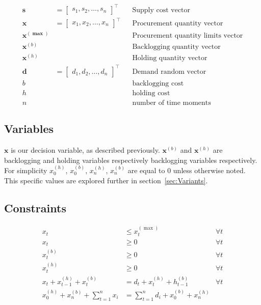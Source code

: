 \begin{align*}
    \mathbf{s} &= \begin{bmatrix}
        s_1, s_2, \dotsc, s_n
    \end{bmatrix}^\intercal && \text{Supply cost vector} \\
    \mathbf{x} &= \begin{bmatrix}
        x_1, x_2, \dotsc, x_n
    \end{bmatrix}^\intercal && \text{Procurement quantity vector} \\
    \mathbf{x^{(\max)}}  & && \text{Procurement quantity limits vector} \\
    \mathbf{x}^{(b)}  & && \text{Backlogging quantity vector} \\
    \mathbf{x}^{(h)}  & && \text{Holding quantity vector} \\
    \mathbf{d} &= \begin{bmatrix}
        d_1, d_2, \dotsc, d_n
    \end{bmatrix}^\intercal && \text{Demand random vector} \\
    b & && \text{backlogging cost} \\
    h & && \text{holding cost} \\
    n & && \text{number of time moments}
\end{align*}


\subsection{Variables}
\label{sub:Variables}
$\mathbf{x}$ is our decision variable, as described previously. $\mathbf{x}^{(b)}$ and $\mathbf{x}^{(h)}$ are backlogging and holding variables respectively backlogging variables respectively. For simplicity
$x^{(h)}_0$, $x^{(b)}_0$,  $x^{(h)}_n$, $x^{(b)}_n$ are equal to $0$ unless otherwise noted. This specific values are explored further in section~\ref{sec:Variants}.

\subsection{Constraints}
\label{sub:Constraints}
\begin{align*}
    x_t &\le x^{(\max)}_t & \forall t\\
    x_t &\ge 0 & \forall t\\
    x^{(b)}_t &\ge 0 & \forall t\\
    x^{(h)}_t &\ge 0 & \forall t\\
    x_t + x^{(h)}_{t - 1} + x^{(b)}_{t} &= d_t + x^{(h)}_t + h^{(b)}_{t - 1} & \forall t \\
    x^{(h)}_0 + x^{(b)}_n + \sum_{t=1}^n{x_i} &= \sum_{t=1}^n{d_i} + x^{(b)}_0 + x^{(h)}_n &\\
\end{align*}

